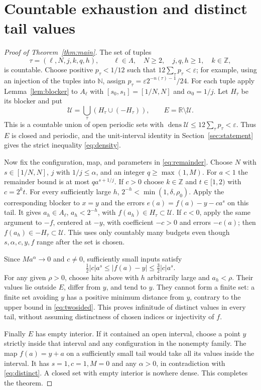 \documentclass[11pt]{article}
\theoremstyle{definition}
\theoremstyle{remark}
\newcommand{\R}{\mathbb R}
\newcommand{\N}{\mathbb N}
\newcommand{\Z}{\mathbb Z}
\newcommand{\dens}{\operatorname{dens}}
\begin{document}
\section{Countable exhaustion and distinct tail values}\label{sec:finish}
\begin{proof}[Proof of Theorem~\ref{thm:main}]
The set of tuples
\[
 \tau=(\ell,N,j,k,q,h),\qquad
 \ell\in\Lambda,\quad N\geq2,\quad j,q,h\geq1,\quad k\in\Z,
\]
is countable. Choose positive $p_\tau<1/12$ such that
$12\sum_\tau p_\tau<\varepsilon$; for example, using an injection of the
tuples into $\N$, assign $p_\tau=\varepsilon2^{-n(\tau)-1}/24$.
For each tuple apply Lemma~\ref{lem:blocker} to $A_\ell$ with
$[s_0,s_1]=[1/N,N]$ and $\alpha_0=1/j$. Let $H_\tau$ be its blocker and put
\[
 \mathcal U=\bigcup_\tau(H_\tau\cup(-H_\tau)),\qquad E=\R\setminus\mathcal U.
\]
This is a countable union of open periodic sets with
$\dens\mathcal U\leq12\sum_\tau p_\tau<\varepsilon$.
Thus $E$ is closed and periodic, and the unit-interval identity in
Section~\ref{sec:statement} gives the strict inequality \eqref{eq:density}.

Now fix the configuration, map, and parameters in \eqref{eq:remainder}.
Choose $N$ with $s\in[1/N,N]$, $j$ with $1/j\leq\alpha$, and an integer
$q\geq\max(1,M)$. For $a<1$ the remainder bound is at most
$q a^{s+1/j}$. If $c>0$ choose $k\in\Z$ and $t\in[1,2)$ with $c=2^kt$.
For every sufficiently large $h$, $2^{-h}<\min(1,\delta,\rho_0)$.
Apply the corresponding blocker to $x=y$ and the errors
$e(a)=f(a)-y-ca^s$ on this tail. It gives $a_h\in A_\ell$, $a_h<2^{-h}$,
with $f(a_h)\in H_\tau\subset\mathcal U$.
If $c<0$, apply the same argument to $-f$, centered at $-y$, with coefficient
$-c>0$ and errors $-e(a)$; then $f(a_h)\in-H_\tau\subset\mathcal U$.
This uses only countably many budgets even though $s,\alpha,c,y,f$ range
after the set is chosen.

Since $M a^\alpha\to0$ and $c\ne0$, sufficiently small inputs satisfy
\begin{equation}\label{eq:twosided}
 \tfrac12|c|a^s\leq |f(a)-y|\leq\tfrac32|c|a^s.
\end{equation}
For any given $\rho>0$, choose hits above with $h$ arbitrarily large and
$a_h<\rho$. Their values lie outside $E$, differ from $y$, and tend to $y$.
They cannot form a finite set: a finite set avoiding $y$ has a positive
minimum distance from $y$, contrary to the upper bound in
\eqref{eq:twosided}. This proves infinitude of distinct values in every tail,
without assuming distinctness of chosen indices or injectivity of $f$.

Finally $E$ has empty interior. If it contained an open interval, choose a
point $y$ strictly inside that interval and any configuration in the nonempty
family. The map $f(a)=y+a$ on a sufficiently small tail would take all its
values inside the interval. It has $s=1,c=1,M=0$ and any $\alpha>0$, in
contradiction with \eqref{eq:distinct}. A closed set with empty interior is
nowhere dense. This completes the theorem.
\end{proof}
\end{document}
